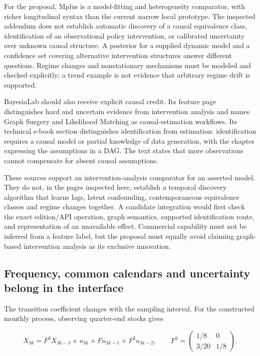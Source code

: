 For the proposal, Mplus is a model-fitting and heterogeneity comparator,
with richer longitudinal syntax than the current narrow local prototype.
The inspected addendum does not establish automatic discovery of a
causal equivalence class, identification of an observational policy
intervention, or calibrated uncertainty over unknown causal structure. A
posterior for a supplied dynamic model and a confidence set covering
alternative intervention structures answer different questions. Regime
changes and nonstationary mechanisms must be modeled and checked
explicitly; a trend example is not evidence that arbitrary regime drift
is supported.

BayesiaLab should also receive explicit causal credit. Its feature page
distinguishes hard and uncertain evidence from intervention analysis and
names Graph Surgery and Likelihood Matching as causal-estimation
workflows. Its technical e-book section distinguishes identification
from estimation: identification requires a causal model or partial
knowledge of data generation, with the chapter expressing the
assumptions in a DAG. The text states that more observations cannot
compensate for absent causal
assumptions.\citep{exec13_ct_bayesia_inference,exec13_ct_bayesia_identification}

These sources support an intervention-analysis comparator for an
asserted model. They do not, in the pages inspected here, establish a
temporal discovery algorithm that learns lags, latent confounding,
contemporaneous equivalence classes and regime changes together. A
candidate integration would first check the exact edition/API operation,
graph semantics, supported identification route, and representation of
an unavailable effect. Commercial capability must not be inferred from a
feature label, but the proposal must equally avoid claiming graph-based
intervention analysis as its exclusive innovation.

\hypertarget{frequency-common-calendars-and-uncertainty-belong-in-the-interface}{%
\subsection{Frequency, common calendars and uncertainty belong in the
interface}\label{frequency-common-calendars-and-uncertainty-belong-in-the-interface}}

The transition coefficient changes with the sampling interval. For the
constructed monthly process, observing quarter-end stocks gives

\[
 X_{3k}=F^3X_{3k-3}+u_{3k}+Fu_{3k-1}+F^2u_{3k-2},\qquad
 F^3=\begin{pmatrix}1/8&0\\3/20&1/8\end{pmatrix}.
\]

